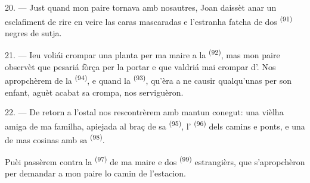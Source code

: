 20. --- Just quand mon paire tornava amb nosautres, Joan daissèt anar un
esclafiment de rire en veire las caras mascaradas e l'estranha fatcha de dos
 \textsuperscript{(91)} negres de sutja.

21. --- Ieu voliái crompar una planta per ma maire a la 
\textsuperscript{(92)}, mas mon paire observèt que pesariá fòrça per la portar e
que valdriá mai crompar d'. Nos apropchèrem de la
 \textsuperscript{(94)}, e quand la 
\textsuperscript{(93)}, qu'èra a ne causir qualqu'unas per son enfant, aguèt acabat
sa crompa, nos serviguèron.

22. --- De retorn a l'ostal nos rescontrèrem amb mantun conegut: una vièlha amiga
de ma familha, apiejada al braç de sa 
\textsuperscript{(95)}, l' \textsuperscript{(96)} dels camins e
ponts, e una de mas cosinas amb sa 
\textsuperscript{(98)}.

Puèi passèrem contra la  \textsuperscript{(97)} de ma maire e dos
 \textsuperscript{(99)} estrangièrs, que s'apropchèron per
demandar a mon paire lo camin de l'estacion.
\VUsaut{6.0mm}
\VUfilet{22mm}
